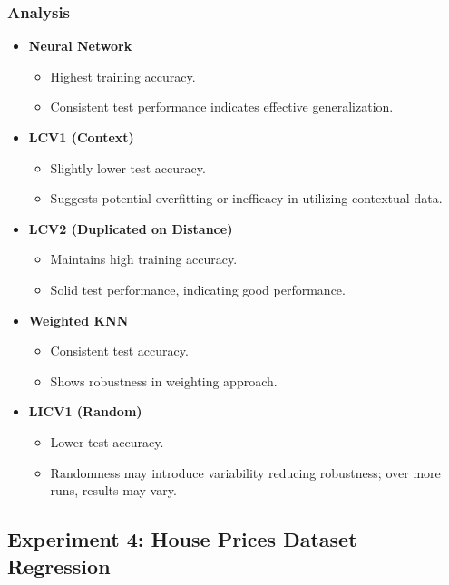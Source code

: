 \documentclass[a4paper, 12pt]{report}
\begin{document}
\subsubsection{Analysis}
\begin{itemize}
    \item \textbf{Neural Network}
    \begin{itemize}
        \item Highest training accuracy.
        \item Consistent test performance indicates effective generalization.
    \end{itemize}
    
    \item \textbf{LCV1 (Context)}
    \begin{itemize}
        \item Slightly lower test accuracy.
        \item Suggests potential overfitting or inefficacy in utilizing contextual data.
    \end{itemize}
    
    \item \textbf{LCV2 (Duplicated on Distance)}
    \begin{itemize}
        \item Maintains high training accuracy.
        \item Solid test performance, indicating good performance.
    \end{itemize}
    
    \item \textbf{Weighted KNN}
    \begin{itemize}
        \item Consistent test accuracy.
        \item Shows robustness in weighting approach.
    \end{itemize}

    \item \textbf{LICV1 (Random)}
    \begin{itemize}
        \item Lower test accuracy.
        \item Randomness may introduce variability reducing robustness; over more runs, results may vary.
    \end{itemize}
\end{itemize}


\subsection{Experiment 4: House Prices Dataset Regression}
\end{document}
